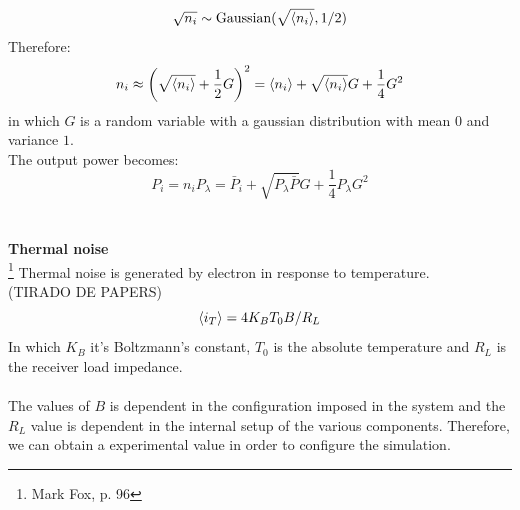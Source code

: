 $$
\sqrt{n_i} \sim \textrm{Gaussian}(\sqrt{\braket{n_i}}, 1/2)
$$
Therefore:
$$
n_i \approx \left( \sqrt{\braket{n_i}} + \frac{1}{2}G \right)^2 = \braket{n_i} + \sqrt{\braket{n_i}} G + \frac{1}{4} G^2
$$
in which $G$ is a random variable with a gaussian distribution with mean $0$ and variance $1$.\\
The output power becomes:
$$
P_i = n_i P_\lambda = \bar{P}_i + \sqrt{P_\lambda \bar{P}} G + \frac{1}{4} P_\lambda G^2
$$
\\
\\
{\bf Thermal noise}\\
\footnote{Mark Fox, p. 96}
Thermal noise is generated by electron in response to temperature.
\\
(TIRADO DE PAPERS)
$$
\braket{i_T} = 4 K_B T_0 B/R_L
$$
In which $K_B$ it's Boltzmann's constant, $T_0$ is the absolute temperature and $R_L$ is the receiver load impedance.\\
\\
The values of $B$ is dependent in the configuration imposed in the system and the $R_L$ value is dependent in the internal setup of the various components. Therefore, we can obtain a experimental value in order to configure the simulation.\\
%
%
%
%
